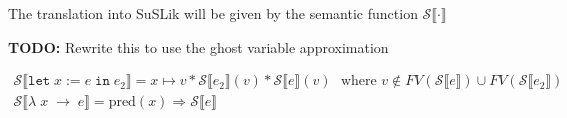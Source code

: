 \documentclass[10pt]{article}
\newcommand{\ttt}[1]{\texttt{#1}}
\newcommand{\ra}{\ensuremath{\rightarrow}}
\newcommand{\Ra}{\ensuremath{\Rightarrow}}
\newcommand{\cons}{\ttt{cons}}
\newcommand{\letbnd}{\ttt{let}}
\newcommand{\inexpr}{\ttt{in}}
\newcommand{\sem} [1] {\llbracket#1\rrbracket}
\newcommand{\Ssem} [1] {\mathcal{S}\sem{#1}}
\begin{document}
\noindent
The translation into SuSLik will be given by the semantic function $\Ssem{\cdot}$

\noindent
\textbf{TODO:} Rewrite this to use the ghost variable approximation

\[
  \begin{array}{cc}
    \Ssem{\letbnd\; x\; \ttt{:=}\; e\; \inexpr\; e_2} = x \mapsto v * \Ssem{e_2}(v) * \Ssem{e}(v)~~~\text{where $v \notin FV(\Ssem{e}) \cup FV(\Ssem{e_2})$}
    \\
    \Ssem{\lambda\; x\; \ra\; e} = \text{pred}(x) \Ra \Ssem{e}
  \end{array}
\]
\end{document}

